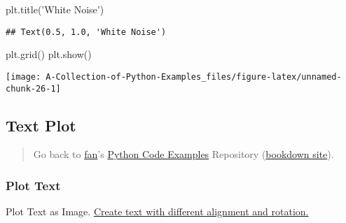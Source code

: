 \documentclass[
]{book}
\newenvironment{Shaded}{\begin{snugshade}}{\end{snugshade}}
\newcommand{\NormalTok}[1]{#1}
\newcommand{\StringTok}[1]{\textcolor[rgb]{0.31,0.60,0.02}{#1}}
\begin{document}
\begin{Shaded}
\begin{Highlighting}[]
\NormalTok{plt.title(}\StringTok{'White Noise'}\NormalTok{)}
\end{Highlighting}
\end{Shaded}

\begin{verbatim}
## Text(0.5, 1.0, 'White Noise')
\end{verbatim}

\begin{Shaded}
\begin{Highlighting}[]
\NormalTok{plt.grid()}
\NormalTok{plt.show()}
\end{Highlighting}
\end{Shaded}

\begin{center}\texttt{[image: A-Collection-of-Python-Examples\_files/figure-latex/unnamed-chunk-26-1]} \end{center}

\hypertarget{text-plot}{%
\subsection{Text Plot}\label{text-plot}}

\begin{quote}
Go back to \href{http://fanwangecon.github.io/}{fan}'s \href{https://fanwangecon.github.io/pyfan/}{Python Code Examples} Repository (\href{https://fanwangecon.github.io/pyfan/bookdown}{bookdown site}).
\end{quote}

\hypertarget{plot-text}{%
\subsubsection{Plot Text}\label{plot-text}}

Plot Text as Image. \href{https://matplotlib.org/3.1.1/gallery/pyplots/text_layout.html\#sphx-glr-gallery-pyplots-text-layout-py}{Create text with different alignment and rotation.}
\end{document}
